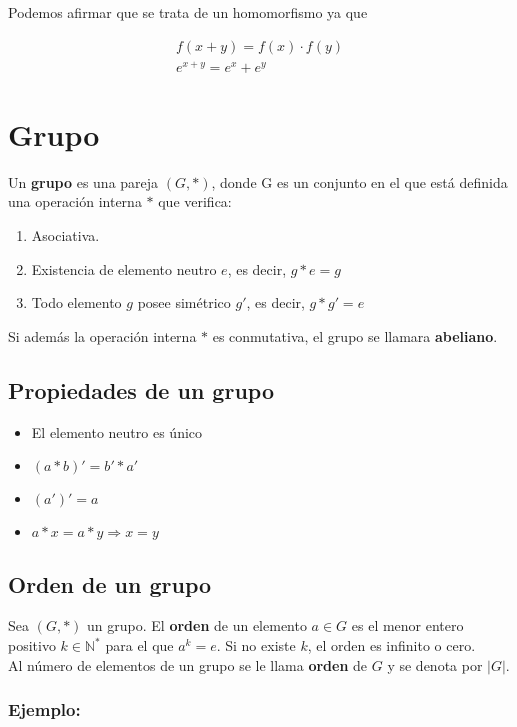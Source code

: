 Podemos afirmar que se trata de un homomorfismo ya que

$$
\begin{matrix}
f(x+y)=f(x)\cdot f(y)\\
e^{x+y}=e^x+e^y
\end{matrix}
$$
\section{Grupo}
Un \textbf{grupo} es una pareja $(G,*)$, donde G es un conjunto en el que está definida una operación interna $*$ que verifica:
\begin{enumerate}
\item Asociativa.
\item Existencia de elemento neutro $e$, es decir, $g*e=g$
\item Todo elemento $g$ posee simétrico $g'$, es decir, $g*g'=e$
\end{enumerate}
Si además la operación interna $*$ es conmutativa, el grupo se llamara \textbf{abeliano}.\\

\subsection*{Propiedades de un grupo}
\begin{itemize}
\item El elemento neutro es único
\item $(a*b)'=b'*a'$
\item $(a')'=a$
\item $a*x=a*y \Rightarrow x=y$
\end{itemize}

\subsection*{Orden de un grupo}
Sea $(G,*)$ un grupo. El \textbf{orden} de un elemento $a \in G$ es el menor entero positivo $k\in \mathbb{N}^*$ para el que $a^k=e$. Si no existe $k$, el orden es infinito o cero.\\

Al número de elementos de un grupo se le llama \textbf{orden} de $G$ y se denota por $|G|$.\\



\subsubsection*{Ejemplo:}

